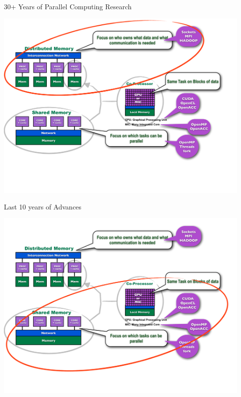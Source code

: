 \begin{frame}
\begin{block}{30+ Years of Parallel Computing Research}
    
\includegraphics[width=0.95\textwidth]
{../common/pics/hardware/ParallelHardware7.pdf}
\end{block}
\end{frame}

\begin{frame}
\begin{block}{Last 10 years of Advances}
    
\includegraphics[width=0.95\textwidth]
{../common/pics/hardware/ParallelHardware8.pdf}
\end{block}
\end{frame}

